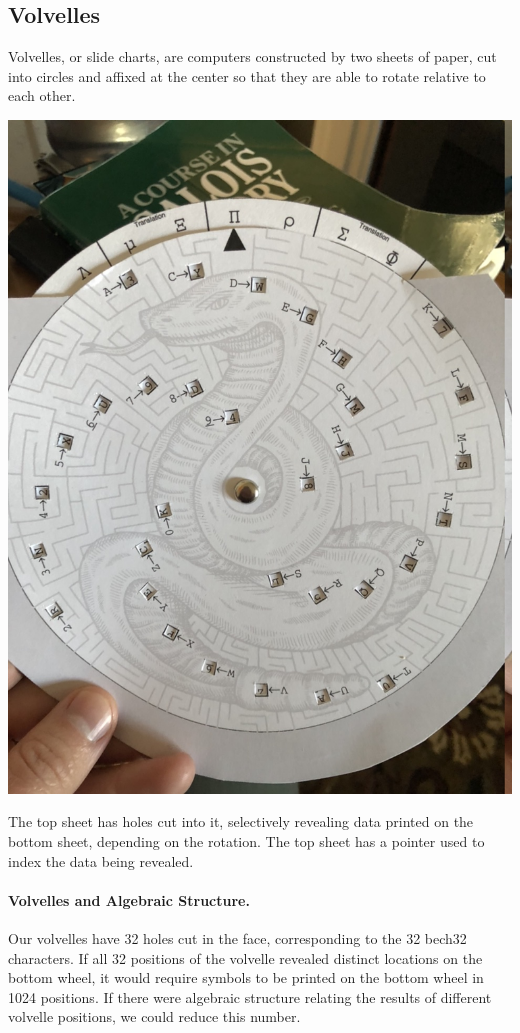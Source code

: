 \documentclass[letterpaper]{article}
\theoremstyle{xxx}
\theoremstyle{evil}
\theoremstyle{yyy}
\theoremstyle{plain}
\theoremstyle{zzz}
\begin{document}
\subsection{Volvelles}

Volvelles, or slide charts, are computers constructed by two sheets of paper, cut
into circles and affixed at the center so that they are able to rotate relative
to each other.

\begin{center} \includegraphics[scale=0.35]{volvelle.jpeg} \end{center}

The top sheet has holes cut into it, selectively revealing data printed on the
bottom sheet, depending on the rotation. The top sheet has a pointer used to
index the data being revealed.

\paragraph{Volvelles and Algebraic Structure.} Our volvelles have 32 holes cut
in the face, corresponding to the 32 bech32 characters. If all 32 positions
of the volvelle revealed distinct locations on the bottom wheel, it would
require symbols to be printed on the bottom wheel in 1024 positions. If there
were algebraic structure relating the results of different volvelle positions,
we could reduce this number.
\end{document}

